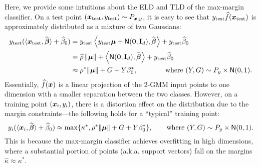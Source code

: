 Here, we provide some intuitions about the ELD and TLD of the max-margin classifier.
On a test point $({\boldsymbol{x}}_\mathrm{test}, y_\mathrm{test}) \sim P_{{\boldsymbol{x}},y}$, it is easy to see that $y_\mathrm{test}\widehat f({\boldsymbol{x}}_\mathrm{test})$ is approximately distributed as a mixture of two Gaussians:
\begin{align*}
    y_\mathrm{test} (\langle {\boldsymbol{x}}_\mathrm{test} , \widehat {{\boldsymbol{\beta}}} \rangle + \widehat \beta_0)  
    &= y_\mathrm{test} \left\langle  y_\mathrm{test}{\boldsymbol{\mu}} + {\sf N}(\mathrm{\bf 0}, \mathrm{\bf I}_d),  \widehat{{\boldsymbol{\beta}}} \right\rangle + y_\mathrm{test} \widehat \beta_0 \\
    &= \widehat\rho \,  \| {\boldsymbol{\mu}}\| +  \left\langle  {\sf N}(\mathrm{\bf 0}, \mathrm{\bf I}_d),  \widehat{{\boldsymbol{\beta}}} \right\rangle  + y_\mathrm{test} \widehat \beta_0 \\
    &\approx \rho^* \| {\boldsymbol{\mu}}\| + G + Y \beta_0^*, \qquad \qquad  \text{where}~(Y, G) \sim P_y \times {\sf N}(0,1).
\end{align*}
Essentially, $\widehat f ({\boldsymbol{x}})$ is a linear projection of the 2-GMM input points to one dimension with a smaller separation between the two classes. However, on a training point $({\boldsymbol{x}}_i, y_i)$, there is a distortion effect on the distribution due to the margin constraints---the following holds for a ``typical'' training point: 
\begin{equation*}
    y_i (\langle {\boldsymbol{x}}_i, \widehat {{\boldsymbol{\beta}}} \rangle + \widehat \beta_0) \approx \max\{ \kappa^*, \rho^* \| {\boldsymbol{\mu}}\| + G + Y \beta_0^* \} , \qquad   \text{where}~(Y, G) \sim P_y \times {\sf N}(0,1).
\end{equation*}
This is because the max-margin classifier achieves overfitting in high dimensions, where a substantial portion of points (a.k.a. support vectors) fall on the margins $\hat\kappa \approx \kappa^*$.







